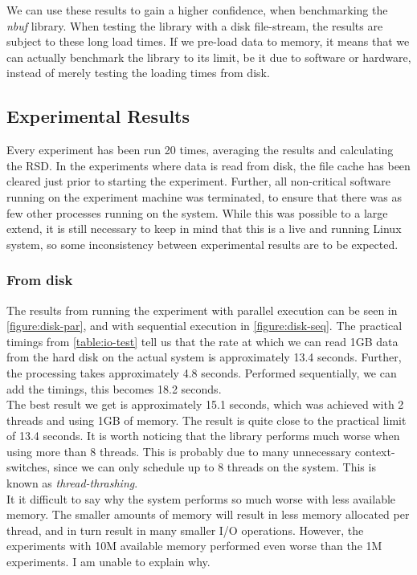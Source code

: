\documentclass[a4paper]{article}
\newcommand{\nbuf}{\textit{nbuf} }
\begin{document}
We can use these results to gain a higher confidence, when benchmarking the \nbuf library. When testing the library with a disk file-stream, the results are subject to these long load times. If we pre-load data to memory, it means that we can actually benchmark the library to its limit, be it due to software or hardware, instead of merely testing the loading times from disk.


\subsection{Experimental Results}
Every experiment has been run 20 times, averaging the results and calculating the RSD. In the experiments where data is read from disk, the file cache has been cleared just prior to starting the experiment. Further, all non-critical software running on the experiment machine was terminated, to ensure that there was as few other processes running on the system. While this was possible to a large extend, it is still necessary to keep in mind that this is a live and running Linux system, so some inconsistency between experimental results are to be expected.


\subsubsection{From disk}
The results from running the experiment with parallel execution can be seen in \autoref{figure:disk-par}, and with sequential execution in \autoref{figure:disk-seq}. The practical timings from \autoref{table:io-test} tell us that the rate at which we can read 1GB data from the hard disk on the actual system is approximately 13.4 seconds. Further, the processing takes approximately 4.8 seconds. Performed sequentially, we can add the timings, this becomes 18.2 seconds.\\

The best result we get is approximately 15.1 seconds, which was achieved with 2 threads and using 1GB of memory. The result is quite close to the practical limit of 13.4 seconds. It is worth noticing that the library performs much worse when using more than 8 threads. This is probably due to many unnecessary context-switches, since we can only schedule up to 8 threads on the system. This is known as \textit{thread-thrashing}.\\

It it difficult to say why the system performs so much worse with less available memory. The smaller amounts of memory will result in less memory allocated per thread, and in turn result in many smaller I/O operations. However, the experiments with 10M available memory performed even worse than the 1M experiments. I am unable to explain why.\\
\end{document}
